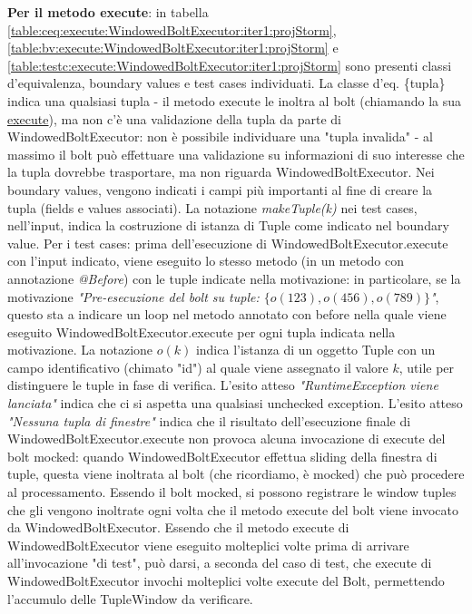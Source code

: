\documentclass[10pt, a4paper]{article}
\newcommand{\gettablelabel}[5]{table:#1:#2:#3:iter#4:proj#5}
\def\storm{Storm}
\newcommand{\ceq}[1]{\{#1\}}
\begin{document}
	\textbf{Per il metodo execute}: in tabella 
	\ref{\gettablelabel{ceq}{execute}{WindowedBoltExecutor}{1}{\storm}},
	\ref{\gettablelabel{bv}{execute}{WindowedBoltExecutor}{1}{\storm}} e 
	\ref{\gettablelabel{testc}{execute}{WindowedBoltExecutor}{1}{\storm}} sono presenti
	classi d'equivalenza, boundary values e test cases individuati. 
	La classe d'eq. \ceq{tupla} indica una qualsiasi tupla - il metodo execute le inoltra al bolt (chiamando la sua 
	\href{https://storm.apache.org/releases/2.6.2/javadocs/org/apache/storm/topology/IWindowedBolt.html#execute(org.apache.storm.windowing.TupleWindow)}
	{execute}),
	ma non c'è una validazione
	della tupla da parte di WindowedBoltExecutor: non è possibile individuare una "tupla invalida" - al massimo il bolt
	può effettuare una validazione su informazioni di suo interesse che la tupla dovrebbe trasportare, ma non riguarda
	WindowedBoltExecutor.
	Nei boundary values, vengono indicati i campi più importanti al fine di creare la tupla (fields e values associati).
	La notazione \textit{makeTuple(k)} nei test cases, nell'input, indica la costruzione di istanza di 
	Tuple come indicato nel boundary value.
	Per i test cases: prima dell'esecuzione di WindowedBoltExecutor.execute con l'input indicato, viene eseguito lo stesso
	metodo (in un metodo con annotazione \textit{@Before}) con le tuple indicate nella motivazione: in particolare, se la
	motivazione \textit{"Pre-esecuzione del bolt su tuple: $\{o(123),o(456),o(789)\}$"}, questo sta a indicare un loop nel metodo
	annotato con before nella quale viene eseguito WindowedBoltExecutor.execute per ogni tupla indicata nella motivazione.
	La notazione $o(k)$ indica l'istanza di un oggetto Tuple con un campo identificativo (chimato "id") al quale viene assegnato
	il valore $k$, utile per distinguere le tuple in fase di verifica.
	L'esito atteso \textit{"RuntimeException viene lanciata"} indica che ci si aspetta una qualsiasi unchecked exception.
	L'esito atteso \textit{"Nessuna tupla di finestre"} indica che il risultato dell'esecuzione finale di 
	WindowedBoltExecutor.execute non provoca alcuna invocazione di execute del bolt mocked: quando WindowedBoltExecutor effettua
	sliding della finestra di tuple, questa viene inoltrata al bolt (che ricordiamo, è mocked) che può procedere al processamento.
	Essendo il bolt mocked, si possono registrare le window tuples che gli vengono inoltrate ogni volta che il metodo execute
	del bolt viene invocato da WindowedBoltExecutor. Essendo che il metodo execute di WindowedBoltExecutor viene eseguito 
	molteplici volte prima di arrivare all'invocazione "di test", può darsi, a seconda del caso di test, 
	che execute di WindowedBoltExecutor invochi molteplici volte execute del Bolt, permettendo l'accumulo delle TupleWindow da
	verificare.
	
\end{document}
